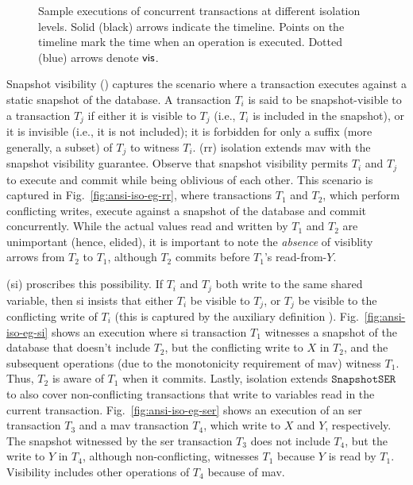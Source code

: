 \begin{figure}
\caption{Sample executions of concurrent transactions at different
isolation levels. Solid (black) arrows indicate the timeline. Points
on the timeline mark the time when an operation is executed. Dotted
(blue) arrows denote $\textsf{vis}$. }
\label{fig:ansi-iso-eg}
\end{figure}

Snapshot visibility () captures the scenario where a
transaction executes against a static snapshot of the database.  A
transaction $T_i$ is said to be snapshot-visible to a transaction
$T_j$ if either it is visible to $T_j$ (i.e., $T_i$ is included in the
snapshot), or it is invisible (i.e., it is not included); it is
forbidden for only a suffix (more generally, a subset) of $T_j$ to
witness $T_i$.  ({\sc rr}) isolation extends {\sc
mav} with the snapshot visibility guarantee.  Observe that snapshot
visibility permits $T_i$ and $T_j$ to execute and commit while being
oblivious of each other. This scenario is captured in
Fig.~\ref{fig:ansi-iso-eg-rr}, where transactions $T_1$ and $T_2$,
which perform conflicting writes, execute against a snapshot of the
database and commit concurrently. While the actual values read and
written by $T_1$ and $T_2$ are unimportant (hence, elided), it is
important to note the \emph{absence} of visiblity arrows from $T_2$ to
$T_1$, although $T_2$ commits before $T_1$'s read-from-$Y$.

 ({\sc si}) proscribes this possibility. If
$T_i$ and $T_j$ both write to the same shared variable, then {\sc si}
insists that either $T_i$ be visible to $T_j$, or $T_j$ be visible to
the conflicting write of $T_i$ (this is captured by the auxiliary
definition ). Fig.~\ref{fig:ansi-iso-eg-si} shows an
execution where {\sc si} transaction $T_1$ witnesses a snapshot of the
database that doesn't include $T_2$, but the conflicting write to $X$
in $T_2$, and the subsequent operations (due to the monotonicity
requirement of {\sc mav}) witness $T_1$. Thus, $T_2$ is aware of $T_1$
when it commits. Lastly,  isolation extends
$\mathtt{SnapshotSER}$ to also cover non-conflicting transactions that
write to variables read in the current transaction.
Fig.~\ref{fig:ansi-iso-eg-ser} shows an execution of an {\sc ser}
transaction $T_3$ and a {\sc mav transaction} $T_4$, which write to $X$
and $Y$, respectively. The snapshot witnessed by the {\sc ser}
transaction $T_3$ does not include $T_4$, but the write to $Y$ in
$T_4$, although non-conflicting, witnesses $T_1$ because $Y$ is read
by $T_1$. Visibility includes other operations of $T_4$ because of
{\sc mav}.

